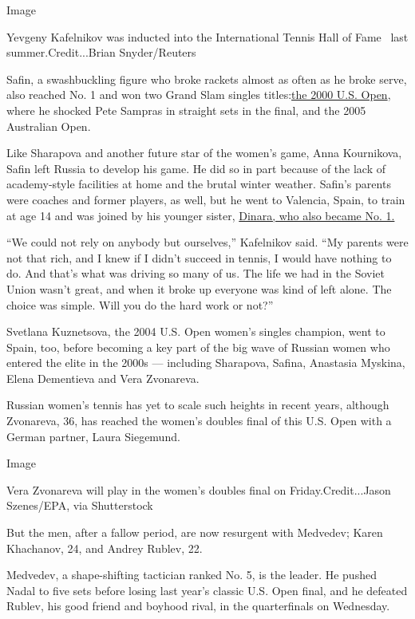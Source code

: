 Image

Yevgeny Kafelnikov was inducted into the International Tennis Hall of
Fame~ last summer.Credit...Brian Snyder/Reuters

Safin, a swashbuckling figure who broke rackets almost as often as he
broke serve, also reached No. 1 and won two Grand Slam singles
titles:\href{https://www.nytimes3xbfgragh.onion/2000/09/11/sports/tennis-us-open-in-the-final-youth-serves.html}{the
2000 U.S. Open}, where he shocked Pete Sampras in straight sets in the
final, and the 2005 Australian Open.

Like Sharapova and another future star of the women's game, Anna
Kournikova, Safin left Russia to develop his game. He did so in part
because of the lack of academy-style facilities at home and the brutal
winter weather. Safin's parents were coaches and former players, as
well, but he went to Valencia, Spain, to train at age 14 and was joined
by his younger sister,
\href{https://www.nytimes3xbfgragh.onion/2010/08/29/sports/tennis/29safina.html}{Dinara,
who also became No. 1.}

``We could not rely on anybody but ourselves,'' Kafelnikov said. ``My
parents were not that rich, and I knew if I didn't succeed in tennis, I
would have nothing to do. And that's what was driving so many of us. The
life we had in the Soviet Union wasn't great, and when it broke up
everyone was kind of left alone. The choice was simple. Will you do the
hard work or not?''

Svetlana Kuznetsova, the 2004 U.S. Open women's singles champion, went
to Spain, too, before becoming a key part of the big wave of Russian
women who entered the elite in the 2000s --- including Sharapova,
Safina, Anastasia Myskina, Elena Dementieva and Vera Zvonareva.

Russian women's tennis has yet to scale such heights in recent years,
although Zvonareva, 36, has reached the women's doubles final of this
U.S. Open with a German partner, Laura Siegemund.

Image

Vera Zvonareva will play in the women's doubles final on
Friday.Credit...Jason Szenes/EPA, via Shutterstock

But the men, after a fallow period, are now resurgent with Medvedev;
Karen Khachanov, 24, and Andrey Rublev, 22.

Medvedev, a shape-shifting tactician ranked No. 5, is the leader. He
pushed Nadal to five sets before losing last year's classic U.S. Open
final, and he defeated Rublev, his good friend and boyhood rival, in the
quarterfinals on Wednesday.

